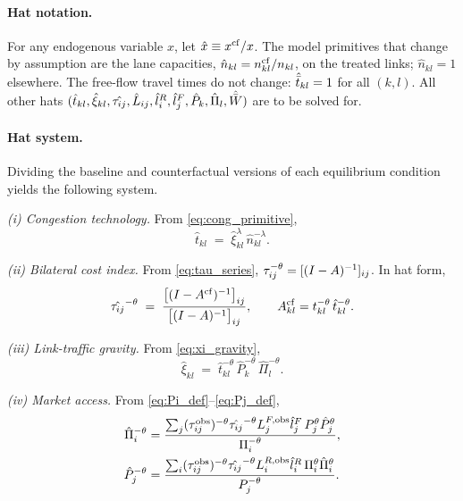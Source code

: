 \paragraph{Hat notation.}
For any endogenous variable $x$, let $\hat x\equiv x^{\mathrm{cf}}/x$.  The
model primitives that change by assumption are the lane capacities,
$\hat n_{kl}=n_{kl}^{\mathrm{cf}}/n_{kl}$, on the treated links; $\hat n_{kl}=1$
elsewhere.  The free-flow travel times do not change:
$\hat{\bar t}_{kl}=1$ for all $(k,l)$.  All other hats
$(\hat t_{kl},\hat\xi_{kl},\hat{\tau_{ij}},\hat L_{ij},\hat l_i^R,\hat
l_j^F,\hat P_k,\hat\Pi_l,\hat{\bar W})$ are to be solved for.

\paragraph{Hat system.}
Dividing the baseline and counterfactual versions of each equilibrium
condition yields the following system.

\emph{(i) Congestion technology.}  From
\eqref{eq:cong_primitive},
\begin{equation}\label{eq:hat_cong}
  \hat t_{kl}
  \;=\;
  \hat\xi_{kl}^{\lambda}\,\hat n_{kl}^{-\lambda}.
\end{equation}

\emph{(ii) Bilateral cost index.}  From \eqref{eq:tau_series},
$\tau_{ij}^{-\theta}=[(I-A)^{-1}]_{ij}$.  In hat form,
\begin{equation}\label{eq:hat_tau}
  \hat{\tau_{ij}}^{-\theta}
  \;=\;
  \frac{\bigl[(I-A^{\mathrm{cf}})^{-1}\bigr]_{ij}}
       {\bigl[(I-A)^{-1}\bigr]_{ij}},
  \qquad
  A^{\mathrm{cf}}_{kl}=t_{kl}^{-\theta}\,\hat t_{kl}^{-\theta}.
\end{equation}

\emph{(iii) Link-traffic gravity.}  From \eqref{eq:xi_gravity},
\begin{equation}\label{eq:hat_xi}
  \hat\xi_{kl}
  \;=\;
  \hat t_{kl}^{-\theta}\,\hat P_k^{-\theta}\,\hat \Pi_l^{-\theta}.
\end{equation}

\emph{(iv) Market access.}  From \eqref{eq:Pi_def}--\eqref{eq:Pj_def},
\begin{align}
  \hat\Pi_i^{-\theta}
  &=\frac{\sum_j (\tau_{ij}^{\mathrm{obs}})^{-\theta}\hat{\tau_{ij}}^{-\theta}
              L_j^{F,\mathrm{obs}}\hat l_j^F\,P_j^{\theta}\hat P_j^{\theta}}
             {\Pi_i^{-\theta}},
  \label{eq:hat_Pi}\\
  \hat P_j^{-\theta}
  &=\frac{\sum_i (\tau_{ij}^{\mathrm{obs}})^{-\theta}\hat{\tau_{ij}}^{-\theta}
              L_i^{R,\mathrm{obs}}\hat l_i^R\,\Pi_i^{\theta}\hat\Pi_i^{\theta}}
             {P_j^{-\theta}}.
  \label{eq:hat_P}
\end{align}

